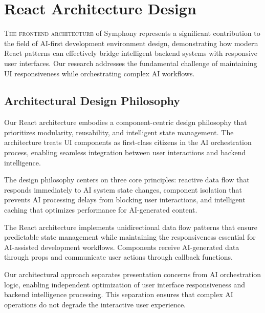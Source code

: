 
\section*{React Architecture Design}

\lettrine{T}{he frontend architecture} of Symphony represents a significant contribution to the field of AI-first development environment design, demonstrating how modern React patterns can effectively bridge intelligent backend systems with responsive user interfaces. Our research addresses the fundamental challenge of maintaining UI responsiveness while orchestrating complex AI workflows.

\subsection*{Architectural Design Philosophy}

Our React architecture embodies a component-centric design philosophy that prioritizes modularity, reusability, and intelligent state management. The architecture treats UI components as first-class citizens in the AI orchestration process, enabling seamless integration between user interactions and backend intelligence.

The design philosophy centers on three core principles: reactive data flow that responds immediately to AI system state changes, component isolation that prevents AI processing delays from blocking user interactions, and intelligent caching that optimizes performance for AI-generated content.

\begin{infobox}[title=Architecture Principles]
The React architecture implements unidirectional data flow patterns that ensure predictable state management while maintaining the responsiveness essential for AI-assisted development workflows. Components receive AI-generated data through props and communicate user actions through callback functions.
\end{infobox}

Our architectural approach separates presentation concerns from AI orchestration logic, enabling independent optimization of user interface responsiveness and backend intelligence processing. This separation ensures that complex AI operations do not degrade the interactive user experience.


